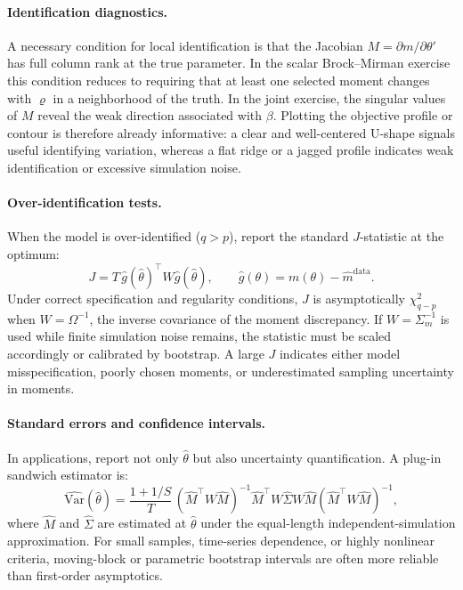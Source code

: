 \documentclass[11pt,a4paper]{report}
\begin{document}
\paragraph{Identification diagnostics.}  A necessary condition for local identification is that the Jacobian $M=\partial m/\partial\theta'$ has full column rank at the true parameter.  In the scalar Brock--Mirman exercise this condition reduces to requiring that at least one selected moment changes with $\varrho$ in a neighborhood of the truth.  In the joint exercise, the singular values of $M$ reveal the weak direction associated with $\beta$.  Plotting the objective profile or contour is therefore already informative: a clear and well-centered U-shape signals useful identifying variation, whereas a flat ridge or a jagged profile indicates weak identification or excessive simulation noise.

\paragraph{Over-identification tests.}  When the model is over-identified ($q > p$), report the standard $J$-statistic at the optimum:
\begin{equation}
J = T \,\hat{g}(\hat{\theta})^\top W \hat{g}(\hat{\theta}), \qquad \hat{g}(\theta)=m(\theta)-\hat{m}^{\mathrm{data}}.
\end{equation}
Under correct specification and regularity conditions, $J$ is asymptotically $\chi^2_{q-p}$ when $W=\Omega^{-1}$, the inverse covariance of the moment discrepancy.  If $W=\Sigma_m^{-1}$ is used while finite simulation noise remains, the statistic must be scaled accordingly or calibrated by bootstrap.  A large $J$ indicates either model misspecification, poorly chosen moments, or underestimated sampling uncertainty in moments.

\paragraph{Standard errors and confidence intervals.}  In applications, report not only $\hat{\theta}$ but also uncertainty quantification.  A plug-in sandwich estimator is:
\begin{equation}
\widehat{\mathrm{Var}}(\hat{\theta}) =
\frac{1+1/S}{T}\,(\hat{M}^\top W \hat{M})^{-1}\hat{M}^\top W \hat{\Sigma} W \hat{M}(\hat{M}^\top W \hat{M})^{-1},
\end{equation}
where $\hat{M}$ and $\hat{\Sigma}$ are estimated at $\hat{\theta}$ under the equal-length independent-simulation approximation.  For small samples, time-series dependence, or highly nonlinear criteria, moving-block or parametric bootstrap intervals are often more reliable than first-order asymptotics.
\end{document}
